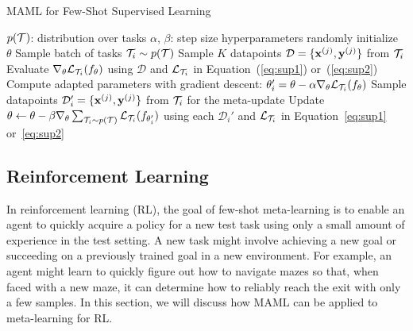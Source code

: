\documentclass{article}
\begin{document}
\begin{algorithm}[t]
\caption{MAML for Few-Shot Supervised Learning}
\label{alg:mamlsup}
\begin{algorithmic}[1]
{\footnotesize
\REQUIRE $p(\mathcal{T})$: distribution over tasks
\REQUIRE $\alpha$, $\beta$: step size hyperparameters
\STATE randomly initialize $\theta$
\STATE Sample batch of tasks $\mathcal{T}_i \sim p(\mathcal{T})$
      \STATE Sample $K$ datapoints $\mathcal{D}=\{\mathbf{x}^{(j)}, \mathbf{y}^{(j)}\}$ from $\mathcal{T}_i$
      \STATE Evaluate $\nabla_\theta \mathcal{L}_{\mathcal{T}_i}(f_\theta)$ using $\mathcal{D}$ and $\mathcal{L}_{\mathcal{T}_i}$ in Equation~(\ref{eq:sup1}) or~(\ref{eq:sup2})
      \STATE Compute adapted parameters with gradient descent: $\theta_i'=\theta-\alpha \nabla_\theta  \mathcal{L}_{\mathcal{T}_i}(  f_\theta )$
      \STATE Sample datapoints $\mathcal{D}_i'=\{\mathbf{x}^{(j)}, \mathbf{y}^{(j)}\}$ from $\mathcal{T}_i$ for the meta-update
 \ENDFOR
 \STATE Update $\theta \leftarrow \theta - \beta \nabla_\theta \sum_{\mathcal{T}_i \sim p(\mathcal{T})}  \mathcal{L}_{\mathcal{T}_i} ( f_{\theta_i'})$ using each $\mathcal{D}_i'$ and $\mathcal{L}_{\mathcal{T}_i}$ in Equation~\ref{eq:sup1} or~\ref{eq:sup2}
\ENDWHILE
}
\end{algorithmic}
\end{algorithm}


\subsection{Reinforcement Learning}





In reinforcement learning (RL), the goal of few-shot meta-learning is to enable an agent to quickly acquire a policy for a new test task using only a small amount of experience in the test setting. A new task might involve achieving a new goal or succeeding on a previously trained goal in a new environment. For example, an agent might learn to quickly figure out how to navigate mazes so that, when faced with a new maze, it can determine how to reliably reach the exit with only a few samples.
In this section, we will discuss how MAML can be applied to meta-learning for RL.
\end{document}
